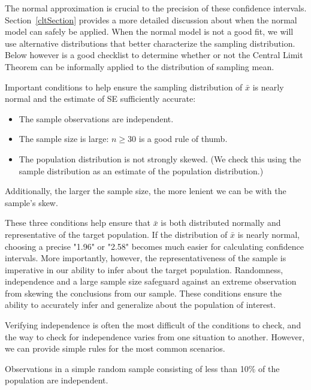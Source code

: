 The normal approximation is crucial to the precision of these confidence intervals. Section~\ref{cltSection} provides a more detailed discussion about when the normal model can safely be applied. When the normal model is not a good fit, we will use alternative distributions that better characterize the sampling distribution. Below however is a good checklist to determine whether or not the Central Limit Theorem can be informally applied to the distribution of sampling mean.

\begin{termBox}{
Important conditions to help ensure the sampling distribution of $\bar{x}$ is nearly normal and the estimate of SE sufficiently accurate:
\begin{itemize}
\setlength{\itemsep}{0mm}
\item The sample observations are independent.
\item The sample size is large: $n\geq30$ is a good rule of thumb.
\item The population distribution is not strongly skewed. (We check this using the sample distribution as an estimate of the population distribution.)
\end{itemize}
Additionally, the larger the sample size, the more lenient we can be with the sample's skew.}
\end{termBox}

These three conditions help ensure that $\bar{x}$ is both distributed normally and representative of the target population. If the distribution of $\bar{x}$ is nearly normal, choosing a precise "1.96" or "2.58" becomes much easier for calculating confidence intervals. More importantly, however, the representativeness of the sample is imperative in our ability to infer about the target population. Randomness, independence and a large sample size safeguard against an extreme observation from skewing the conclusions from our sample. These conditions ensure the ability to accurately infer and generalize about the population of interest.

Verifying independence is often the most difficult of the conditions to check, and the way to check for independence varies from one situation to another. However, we can provide simple rules for the most common scenarios. 

\begin{tipBox}{
Observations in a simple random sample consisting of less than 10\% of the population are independent.}
\end{tipBox}


